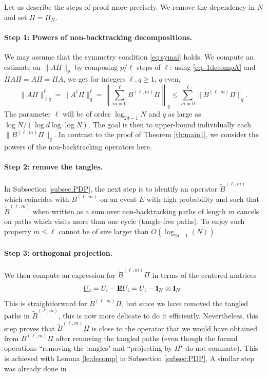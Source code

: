 \documentclass[11pt]{article}
\newcommand{\dE}{\mathbf {E}}
\newcommand{\NRM}[1]{{{\left\| #1\right\|}}} %
\newcommand{\1}{1\!\!{\sf I}}
\newcommand{\IND}{\1}
\begin{document}
Let us describe the steps of proof more precisely. We remove the dependency in $N$ and set $\Pi= \Pi_N$. 

\paragraph{Step 1: Powers of non-backtracking decompositions. } We may assume that the symmetry condition \eqref{eq:symai} holds.  We  compute an estimate on $\|A \Pi \|_p$ by composing $p/\ell$ steps of $\ell$:  using \eqref{eq:-1decompA} and $\Pi A \Pi = A\Pi = \Pi A$, we get for integers $\ell,q \geq 1$, $q$ even, 
$$
\| A \Pi\|_{\ell q} ^\ell = \| A^\ell \Pi\|_{ q} ^\ell = \NRM{ \sum_{m=0}^{\ell}   B^{(\ell,m)} \Pi }_q \leq \sum_{m=0}^{\ell}  \| B^{(\ell,m)} \Pi \|_q  .
$$
The parameter $\ell$ will be of order $\log_{2d -1} N$ and $q$  as large as $\log N / (\log d \log \log N)$. The goal is then to upper-bound individually each $\| B^{(\ell,m)} \Pi \|_q$. 
In contrast to the proof of Theorem \ref{th:main1}, we consider the powers of the non-backtracking operators here. 

\paragraph{Step 2: remove the tangles. } In Subsection \ref{subsec:PDP}, the next step is to identify an operator $\widetilde B^{(\ell,m)}$ which coincides with $B^{(\ell,m)}$ on an event $E$ with high probability and such that $\widetilde B^{(\ell,m)}$ when written as a sum over non-backtracking paths of length $m$ cancels on paths which visits more than one cycle (tangle-free paths). To enjoy such property $m \leq \ell$ cannot  be of size larger than $O (\log_{2d -1} (N) ) $. 

\paragraph{Step 3: orthogonal projection. } We then compute an expression for $\widetilde B^{(\ell,m)} \Pi$ in terms of the centered matrices 
$$\underline U_i = U_i - \dE U_i = U_i - \IND_N \otimes \IND_N.$$ 
This is straightforward for $ B^{(\ell,m)} \Pi$, but since we have removed the tangled paths in $\widetilde B^{(\ell,m)}$, this is now more delicate to do it efficiently. Nevertheless, this step proves that $\widetilde B^{(\ell,m)} \Pi$ is close to the operator that we would have obtained from $ B^{(\ell,m)} \Pi$ after removing the tangled paths (even though the formal operations ``removing the tangles" and ``projecting by $\Pi$" do not commute). This is achieved with Lemma \ref{le:decomp} in Subsection \ref{subsec:PDP}. A similar step was already done in \cite{M13,BLM,MR3792625,MR4024563}. 
\end{document}
